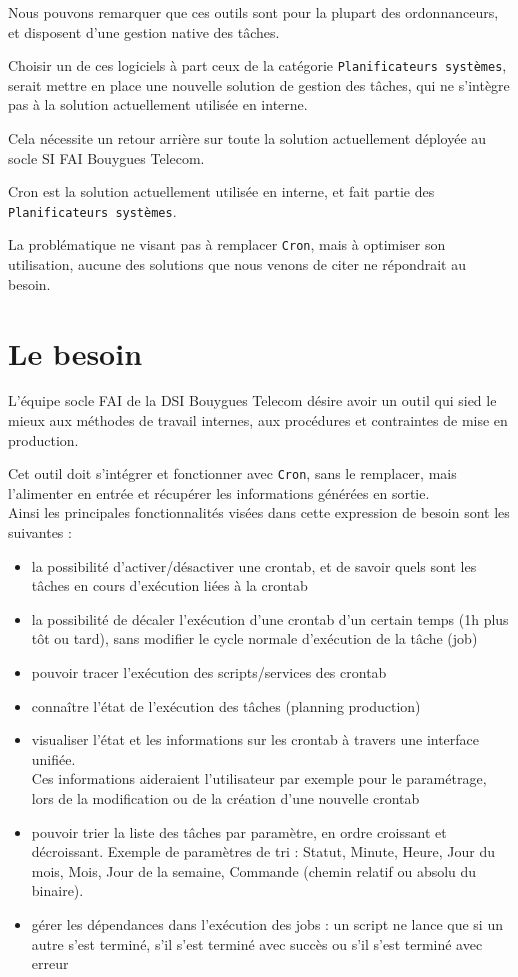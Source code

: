 \documentclass{bouygues-fr}
\begin{document}
\vspace{18pt}
Nous pouvons remarquer que ces outils sont pour la plupart des ordonnanceurs, et disposent d'une gestion native des tâches.

Choisir un de ces logiciels à part ceux de la catégorie \texttt{Planificateurs systèmes}, serait mettre en place une nouvelle solution de gestion des tâches, qui ne s'intègre pas à la solution actuellement utilisée en interne.

Cela nécessite un retour arrière sur toute la solution actuellement déployée au socle SI FAI Bouygues Telecom.

Cron est la solution actuellement utilisée en interne, et fait partie des \texttt{Planificateurs systèmes}.

La problématique ne visant pas à remplacer \texttt{Cron}, mais à optimiser son utilisation, aucune des solutions que nous venons de citer ne répondrait au besoin.

\vspace{20pt}
\section{Le besoin}
L'équipe socle FAI de la DSI Bouygues Telecom désire avoir un outil qui sied le mieux aux méthodes de travail internes, aux procédures et contraintes de mise en production.

Cet outil doit s'intégrer et fonctionner avec \texttt{Cron}, sans le remplacer, mais l'alimenter en entrée et récupérer les informations générées en sortie.\\

Ainsi les principales fonctionnalités visées dans cette expression de besoin sont les suivantes :
\begin{itemize}
\item la possibilité d'activer/désactiver une crontab, et de savoir quels sont les tâches en cours d'exécution liées à la crontab
\item la possibilité de décaler l'exécution d'une crontab d'un certain temps (1h plus tôt ou tard), sans modifier le cycle normale d'exécution de la tâche (job)
\item pouvoir tracer l'exécution des scripts/services des crontab
\item connaître l'état de l'exécution des tâches (planning production)
\item visualiser l'état et les informations sur les crontab à travers une interface unifiée.\\
  Ces informations aideraient l'utilisateur par exemple pour le paramétrage, lors de la modification ou de la création d'une nouvelle crontab
\item pouvoir trier la liste des tâches par paramètre, en ordre croissant et décroissant. Exemple de paramètres de tri : Statut, Minute, Heure, Jour du mois, Mois, Jour de la semaine, Commande (chemin relatif ou absolu du binaire).
\item gérer les dépendances dans l'exécution des jobs : un script ne lance que si un autre s'est terminé, s'il s'est terminé avec succès ou s'il s'est terminé avec erreur
\end{itemize}
\end{document}
